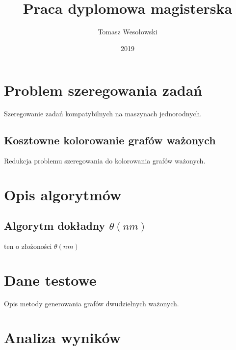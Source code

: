 \documentclass{article}
\title{Praca dyplomowa magisterska}
\author{Tomasz Wesołowski}
\date{2019}
\begin{document}
 
\maketitle
 
\tableofcontents
 
\section{Problem szeregowania zadań}

Szeregowanie zadań kompatybilnych na maszynach jednorodnych.

\subsection{Kosztowne kolorowanie grafów ważonych}

Redukcja problemu szeregowania do kolorowania grafów ważonych.

\section{Opis algorytmów}

\subsection{Algorytm dokładny $\theta (nm)$}

ten o złożoności $\theta (nm)$ 

\section{Dane testowe}

Opis metody generowania grafów dwudzielnych ważonych.

\section{Analiza wyników}
 
\end{document}
